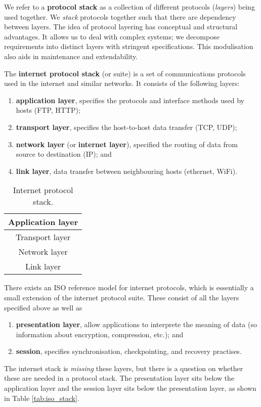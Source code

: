 We refer to a \textbf{protocol stack} as a collection of different protocols (\emph{layers}) being used together. We \emph{stack} protocols together such that there are dependency between layers. The idea of protocol layering has conceptual and structural advantages. It allows us to deal with complex systems; we decompose requirements into distinct layers with stringent specifications. This modulisation also aids in maintenance and extendability. 

\begin{example}
    The \textbf{internet protocol stack} (or suite) is a set of communications protocols used in the internet and similar networks. It consists of the following layers:
    \begin{enumerate}
        \item \textbf{application layer}, specifies the protocols and interface methods used by hosts (FTP, HTTP);
        \item \textbf{transport layer}, specifies the host-to-host data transfer (TCP, UDP);
        \item \textbf{network layer} (or \textbf{internet layer}), specified the routing of data from source to destination (IP); and
        \item \textbf{link layer}, data transfer between neighbouring hosts (ethernet, WiFi).
    \end{enumerate}
\end{example}

\begin{table}
    \centering
    \caption{Internet protocol stack.}
    \begin{tabular}{c}
        \toprule
        Application layer \\
        \midrule
        Transport layer \\
        \midrule
        Network layer \\
        \midrule
        Link layer \\
        \bottomrule
    \end{tabular}
\end{table}

\begin{example}[ISO]
    There exists an ISO reference model for internet protocols, which is essentially a small extension of the internet protocol suite. These consist of all the layers specified above as well as
    \begin{enumerate}
        \item \textbf{presentation layer}, allow applications to interprete the meaning of data (so information about encryption, compression, etc.); and
        \item \textbf{session}, specifies synchronisation, checkpointing, and recovery practises.
    \end{enumerate}
    The internet stack is \emph{missing} these layers, but there is a question on whether these are needed in a protocol stack. The presentation layer sits below the application layer and the session layer sits below the presentation layer, as shown in Table \ref{tab:iso_stack}.
\end{example}

